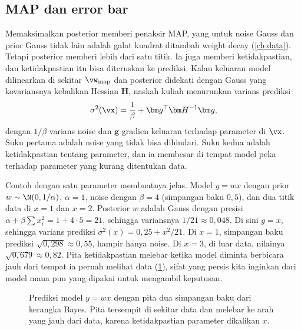 \subsection{MAP dan error bar}

Memaksimalkan posterior memberi penaksir MAP, yang untuk noise Gauss dan prior Gauss tidak lain adalah galat kuadrat
ditambah weight decay (\cref{ch:data}). Tetapi posterior memberi lebih dari satu titik. Ia juga memberi ketidakpastian, dan
ketidakpastian itu bisa diteruskan ke prediksi. Kalau keluaran model dilinearkan di sekitar $\vw_{\mathrm{map}}$ dan posterior
didekati dengan Gauss yang kovariansnya kebalikan Hessian $\bm H$, naskah kuliah menurunkan varians prediksi
\begin{equation}
\sigma^2(\vx)=\frac1\beta+\bm g^\top\bm H^{-1}\bm g,
\end{equation}
dengan $1/\beta$ varians noise dan $\bm g$ gradien keluaran terhadap parameter di $\vx$. Suku pertama adalah noise yang tidak
bisa dihindari. Suku kedua adalah ketidakpastian tentang parameter, dan ia membesar di tempat model peka terhadap parameter
yang kurang ditentukan data.

Contoh dengan satu parameter membuatnya jelas. Model $y=wx$ dengan prior $w\sim\N(0,1/\alpha)$, $\alpha=1$, noise dengan
$\beta=4$ (simpangan baku $0{,}5$), dan dua titik data di $x=1$ dan $x=2$. Posterior $w$ adalah Gauss dengan presisi
$\alpha+\beta\sum x_i^2=1+4\cdot5=21$, sehingga variansnya $1/21\approx0{,}048$. Di sini $g=x$, sehingga varians prediksi
$\sigma^2(x)=0{,}25+x^2/21$. Di $x=1$, simpangan baku prediksi $\sqrt{0{,}298}\approx0{,}55$, hampir hanya noise. Di $x=3$, di luar
data, nilainya $\sqrt{0{,}679}\approx0{,}82$. Pita ketidakpastian melebar ketika model diminta berbicara jauh dari tempat ia
pernah melihat data (\cref{fig:errorbar}), sifat yang persis kita inginkan dari model mana pun yang dipakai untuk mengambil
keputusan.

\begin{figure}[ht]
\centering
{}
\caption{Prediksi model $y=wx$ dengan pita dua simpangan baku dari kerangka Bayes. Pita tersempit di sekitar data dan
melebar ke arah yang jauh dari data, karena ketidakpastian parameter dikalikan $x$.}
\label{fig:errorbar}
\end{figure}


